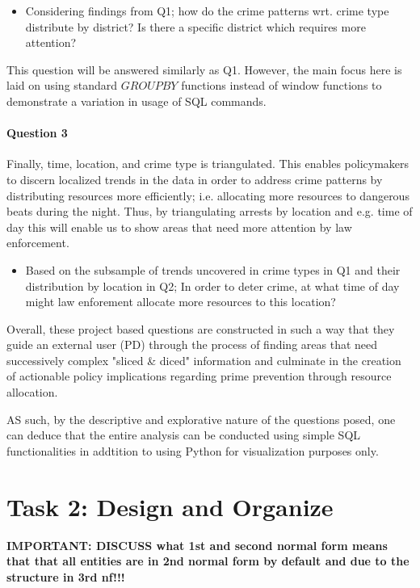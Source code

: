 \documentclass[a4paper]{article}
\begin{document}
\begin{itemize}
    \item Considering findings from Q1; how do the crime patterns wrt. crime type distribute by district? Is there a specific district which requires more attention?
\end{itemize}

This question will be answered similarly as Q1. However, the main focus here is laid on using standard $GROUP BY$ functions instead of window functions to demonstrate a variation in usage of SQL commands. 

\paragraph{Question 3} Finally, time, location, and crime type is triangulated. This enables policymakers to discern localized trends in the data in order to address crime patterns by distributing resources more efficiently; i.e. allocating more resources to dangerous beats during the night. Thus, by triangulating arrests by location and e.g. time of day this will enable us to show areas that need more attention by law enforcement.

\begin{itemize}
  \item Based on the subsample of trends uncovered in crime types in Q1 and their distribution by location in Q2; In order to deter crime, at what time of day might law enforement allocate more resources to this location?
\end{itemize}

Overall, these project based questions are constructed in such a way that they guide an external user (PD) through the process of finding areas that need successively complex "sliced \& diced" information and culminate in the creation of actionable policy implications regarding prime prevention through resource allocation.

AS such, by the descriptive and explorative nature of the questions posed, one can deduce that the entire analysis can be conducted using simple SQL functionalities in addtition to using Python for visualization purposes only.




\section{Task 2: Design and Organize}
\textbf{IMPORTANT: DISCUSS what 1st and second normal form means that that all entities are in 2nd normal form by default and due to the structure in 3rd nf!!!}
\end{document}
